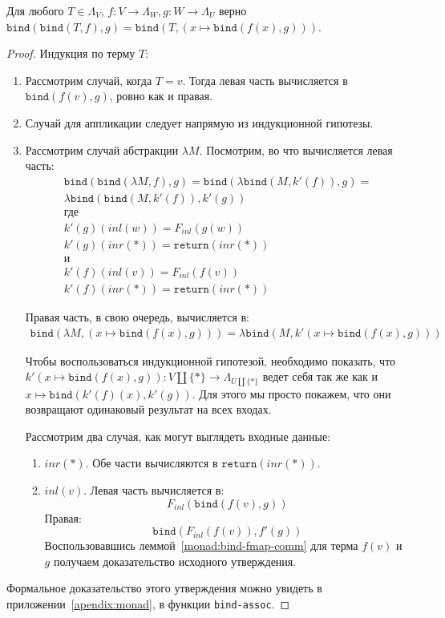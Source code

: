 \begin{prop}
  \label{monad:bind-assoc}
  Для любого $T \in \Lambda_{V}$, $f : V \to \Lambda_{W}, g : W \to \Lambda_{U}$ верно $\texttt{bind}(\texttt{bind}(T, f), g) = \texttt{bind}(T, (x \mapsto \texttt{bind}(f(x), g)) )$.
\end{prop}

\begin{proof}
  Индукция по терму $T$:
  \begin{enumerate}
    \item Рассмотрим случай, когда $T = v$. Тогда левая часть вычисляется в $\texttt{bind}(f(v), g)$, ровно как и правая.
    \item Случай для аппликации следует напрямую из индукционной гипотезы.
    \item Рассмотрим случай абстракции $\lambda M$. Посмотрим, во что вычисляется левая часть:
    \begin{gather*}
      \texttt{bind}(\texttt{bind}(\lambda M, f), g) = \texttt{bind}(\lambda \texttt{bind}(M, k'(f)), g) = \\
      \lambda \texttt{bind}(\texttt{bind}(M, k'(f)), k'(g)) \\
      \text{где} \\
      k'(g)(inl(w)) = F_{inl}(g(w)) \\
      k'(g)(inr(*)) = \texttt{return}(inr(*)) \\
      \text{и} \\
      k'(f)(inl(v)) = F_{inl}(f(v)) \\
      k'(f)(inr(*)) = \texttt{return}(inr(*))
    \end{gather*}

    Правая часть, в свою очередь, вычисляется в:
    \begin{gather*}
      \texttt{bind}(\lambda M, (x \mapsto \texttt{bind}(f(x), g))) = \lambda \texttt{bind}(M, k'(x \mapsto \texttt{bind}(f(x), g)))
    \end{gather*}

    Чтобы воспользоваться индукционной гипотезой, необходимо показать, что $k'(x \mapsto \texttt{bind}(f(x), g)) : V \coprod \{*\} \to \Lambda_{U \coprod \{*\}}$ ведет себя так же как и $x \mapsto \texttt{bind}(k'(f)(x), k'(g))$. Для этого мы просто покажем, что они возвращают одинаковый результат на всех входах.

    Рассмотрим два случая, как могут выглядеть входные данные:
    \begin{enumerate}
      \item $inr(*)$. Обе части вычисляются в $\texttt{return}(inr(*))$.
      \item $inl(v)$. Левая часть вычисляется в: $$ F_{inl}(\texttt{bind}(f(v), g)) $$
      Правая: $$\texttt{bind}(F_{inl}(f(v)), f'(g))$$
      Воспользовавшись леммой~\ref{monad:bind-fmap-comm} для терма $f(v)$ и $g$ получаем доказательство исходного утверждения. \qedhere
    \end{enumerate}
  \end{enumerate}

  Формальное доказательство этого утверждения можно увидеть в приложении~\ref{apendix:monad}, в функции \texttt{bind-assoc}.
\end{proof}


